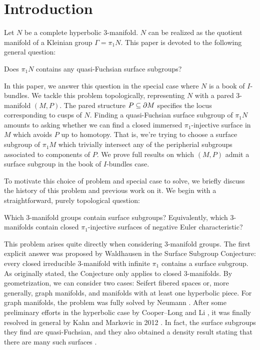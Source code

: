 \section{Introduction}

Let $N$ be a complete hyperbolic 3-manifold. $N$ can be realized as the
quotient manifold of a Kleinian group $\Gamma=\pi_1N$. This paper is devoted to
the following general question:

\begin{prob}

Does $\pi_1N$ contains any quasi-Fuchsian surface subgroups?

\end{prob}

In this paper, we answer this question in the special case where $N$ is a book
of $I$-bundles. We tackle this problem topologically, representing $N$ with
a pared 3-manifold $(M,P)$.  The pared structure $P\subseteq\partial M$ specifies the
locus corresponding to cusps of $N$. Finding a quasi-Fuchsian surface subgroup
of $\pi_1N$ amounts to asking whether we can find a closed immersed
$\pi_1$-injective surface in $M$ which avoids $P$ up to homotopy.  That is,
we're trying to choose a surface subgroup of $\pi_1M$ which trivially intersect
any of the peripherial subgroups associated to components of $P$. We prove full
results on which $(M,P)$ admit a surface subgroup in the book of $I$-bundles
case.

To motivate this choice of problem and special case to solve, we briefly
discuss the history of this problem and previous work on it. We begin with
a straightforward, purely topological question:

\begin{prob}

Which 3-manifold groups contain surface subgroups? Equivalently, which
3-manifolds contain closed $\pi_1$-injective surfaces of negative Euler
characteristic?

\end{prob}

This problem arises quite directly when considering 3-manifold groups. The
first explicit answer was proposed by Waldhausen \cite{Kirby} in
the Surface Subgroup Conjecture: every closed irreducible 3-manifold with
infinite $\pi_1$ contains a surface subgroup. As originally stated, the
Conjecture only applies to closed 3-manifolds. By geometrization, we can
consider two cases: Seifert fibered spaces or, more generally, graph manifolds,
and manifolds with at least one hyperbolic piece. For graph manifolds, the
problem was fully solved by Neumann \cite{Neu}.  After some preliminary
efforts in the hyperbolic case by Cooper--Long \cite{CooperLong} and Li
\cite{Li}, it was finally resolved in general by Kahn and Markovic in
2012 \cite{KM}.  In fact, the surface subgroups they find are quasi-Fuchsian,
and they also obtained a density result stating that there are many such
surfaces \cite{KM2}.

